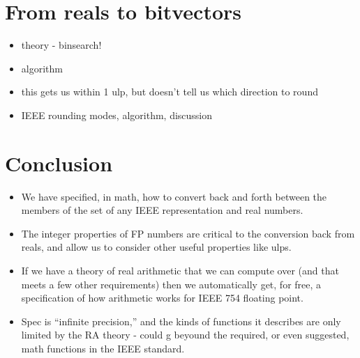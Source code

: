 \documentclass[letterpaper,10pt]{article}
\begin{document}
\section{From reals to bitvectors}

\begin{itemize}
 \item theory - binsearch!
 \item algorithm
 \item this gets us within 1 ulp, but doesn't tell us which direction to round
 \item IEEE rounding modes, algorithm, discussion
\end{itemize}

\section{Conclusion}

\begin{itemize}
 \item We have specified, in math, how to convert back and forth between the members of the set of any IEEE representation and real numbers.
 \item The integer properties of FP numbers are critical to the conversion back from reals, and allow us to consider other useful properties like ulps.
 \item If we have a theory of real arithmetic that we can compute over (and that meets a few other requirements) then we automatically get, for free, a specification of how arithmetic works for IEEE 754 floating point.
 \item Spec is ``infinite precision,'' and the kinds of functions it describes are only limited by the RA theory - could g beyound the required, or even suggested, math functions in the IEEE standard.
\end{itemize}





\end{document}
